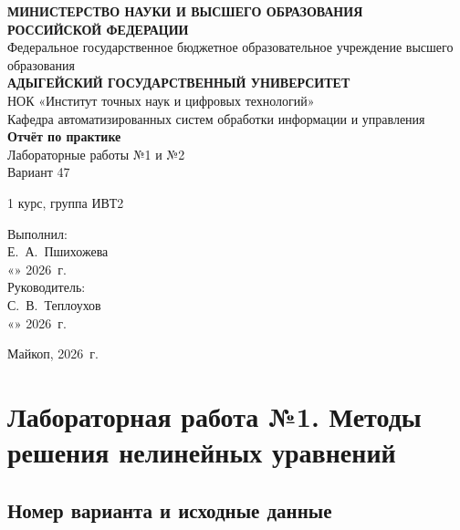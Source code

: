 \documentclass[a4paper,12pt]{article}
\begin{document}
\begin{titlepage}
\begin{center}
\textbf{МИНИСТЕРСТВО НАУКИ И ВЫСШЕГО ОБРАЗОВАНИЯ\\
РОССИЙСКОЙ ФЕДЕРАЦИИ}\\[0.3cm]
Федеральное государственное бюджетное образовательное учреждение высшего образования\\[0.2cm]
\textbf{АДЫГЕЙСКИЙ ГОСУДАРСТВЕННЫЙ УНИВЕРСИТЕТ}\\[0.2cm]
НОК «Институт точных наук и цифровых технологий» \\
Кафедра автоматизированных систем обработки информации и управления\\

\vspace{2cm}
{\Large \textbf{Отчёт по практике}}\\[0.4cm]
{\large Лабораторные работы №1 и №2}\\[0.3cm]
{\large Вариант 47}

\vspace{0.4cm}
1 курс, группа ИВТ2

\vspace{2.5cm}
\begin{flushright}
Выполнил:\\
Е.~А.~Пшихожева\\[0.5cm]
«\underline{\hspace{1cm}}» \underline{\hspace{2.5cm}} 2026~г.\\[0.8cm]
Руководитель:\\
С.~В.~Теплоухов\\[0.5cm]
«\underline{\hspace{1cm}}» \underline{\hspace{2.5cm}} 2026~г.
\end{flushright}

\vfill
Майкоп, 2026~г.
\end{center}
\end{titlepage}

\tableofcontents
\newpage

\section{Лабораторная работа №1. Методы решения нелинейных уравнений}

\subsection{Номер варианта и исходные данные}
\end{document}
